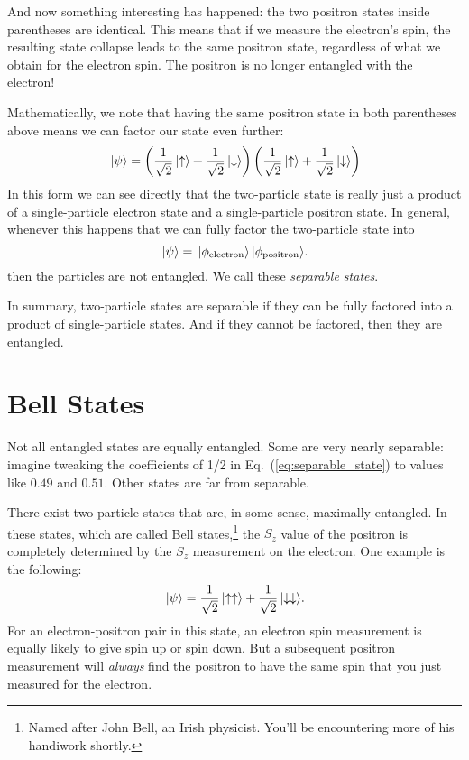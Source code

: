 And now something interesting has happened: the two positron states
inside parentheses are identical.  This means that if we measure the
electron's spin, the resulting state collapse leads to the same
positron state, regardless of what we obtain for the electron spin.
The positron is no longer entangled with the electron!

Mathematically, we note that having the same positron state in both
parentheses above means we can factor our state even further:
\begin{equation}
\,|\mbox{$\psi$}\rangle = 
\left(\frac{1}{\sqrt{2}}\,|\mbox{$\uparrow$}\rangle +\frac{1}{\sqrt{2}}\,|\mbox{$\downarrow$}\rangle
 \right)
\left(\frac{1}{\sqrt{2}}\,|\mbox{$\uparrow$}\rangle +\frac{1}{\sqrt{2}}\,|\mbox{$\downarrow$}\rangle
 \right)
\end{equation}
In this form we can see directly that the two-particle state is really
just a product of a single-particle electron state and a single-particle
positron state.  In general, whenever this happens that we can
fully factor the two-particle state into
\begin{equation}
\,|\mbox{$\psi$}\rangle = \,|\mbox{$\phi_\text{electron}$}\rangle\,|\mbox{$\phi_\text{positron}$}\rangle .
\end{equation}
then the particles are not entangled.  We call these
\textit{separable states}.

In summary, two-particle states are separable if they can be fully
factored into a product of single-particle states.  And if they cannot
be factored, then they are entangled.

\section{Bell States}
\label{sec:bell_states}

Not all entangled states are equally entangled.  Some are very nearly
separable: imagine tweaking the coefficients of 1/2 in
Eq.~(\ref{eq:separable_state}) to values like $0.49$ and $0.51$.
Other states are far from separable.

There exist two-particle states that are, in some sense, maximally
entangled.  In these states, which are called Bell
states,\footnote{Named after John Bell, an Irish physicist.  You'll be
  encountering more of his handiwork shortly.}  the $S_z$
value of the positron is completely determined by the $S_z$
measurement on the electron.  One example is the following:
\begin{equation}
  \,|\mbox{$\psi$}\rangle = \frac{1}{\sqrt{2}}\,|\mbox{$\uparrow\uparrow$}\rangle
 + \frac{1}{\sqrt{2}}\,|\mbox{$\downarrow\downarrow$}\rangle .
\label{eq:bell_state_example}
\end{equation}
For an electron-positron pair in this state, an electron spin measurement
is equally likely to give spin up or spin down.  But a subsequent
positron measurement will \textit{always} find the positron to have the same
spin that you just measured for the electron.

